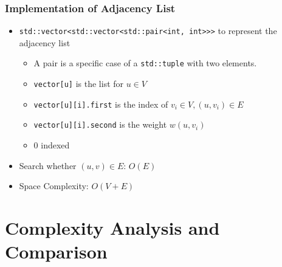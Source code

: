 \documentclass[a4paper]{beamer}
\begin{document}
\begin{frame}
	\frametitle{Implementation of Adjacency List}
	\begin{itemize}
		\item \texttt{std::vector<std::vector<std::pair<int, int>>>} to represent the adjacency list
		\begin{itemize}
			\item A pair is a specific case of a \texttt{std::tuple} with two elements.
			\item \texttt{vector[u]} is the list for \( u \in V \) 
			\item \texttt{vector[u][i].first} is the index of \( v_i \in V, (u, v_i) \in E \) 
			\item \texttt{vector[u][i].second} is the weight \( w(u, v_i) \) 	
			\item 0 indexed
		\end{itemize}
		\item Search whether \( (u, v) \in E \): \( O(E) \)  
		\item Space Complexity: \( O(V+E) \) 
	\end{itemize}
\end{frame}

\section{Complexity Analysis and Comparison}
\begin{frame}
	
\end{frame}
\end{document}
